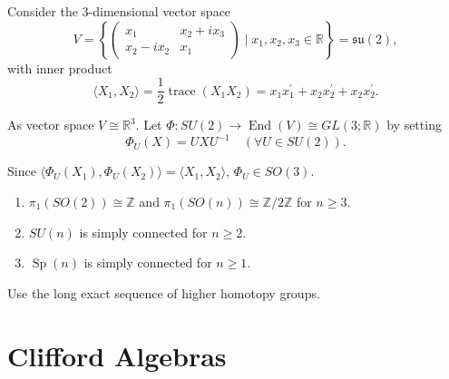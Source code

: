 \documentclass[11pt]{homework}
\begin{document}
\begin{remark}
    Consider the 3-dimensional vector space 
    \begin{equation*}
        V = \left\{\begin{pmatrix}
            x_1 & x_2 + i x_3 \\
            x_2 - i x_2 & x_1
        \end{pmatrix} \mid x_1, x_2, x_3 \in \mathbb{R} \right\} = \mathfrak{su(2)},
    \end{equation*}
    with inner product 
    \begin{equation*}
        \langle X_1, X_2 \rangle = \frac{1}{2} \operatorname{trace} (X_1 X_2) = x_1 x_1^\prime + x_2 x_2^\prime + x_2 x_2^\prime.
    \end{equation*}

    As vector space $V \cong \mathbb{R}^3$.
    Let $\Phi : SU(2) \rightarrow \operatorname{End}(V) \cong GL(3 ; \mathbb{R})$ by setting 
    \begin{equation*}
        \Phi_U (X) = U X U^{-1} \quad (\forall U \in SU(2)).
    \end{equation*}

    Since $\langle \Phi_U (X_1), \Phi_U (X_2) \rangle = \langle X_1, X_2 \rangle$, $\Phi_U \in SO(3)$.
\end{remark}


\begin{theorem}
    \begin{enumerate}
        \item $\pi_{1}(S O(2)) \cong \mathbb{Z}$ and $\pi_{1}(S O(n)) \cong \mathbb{Z} / 2 \mathbb{Z}$ for $n \geq 3$.
        \item $S U(n)$ is simply connected for $n \geq 2$.
        \item $\operatorname{Sp}(n)$ is simply connected for $n \geq 1$.
    \end{enumerate}
\end{theorem}

\begin{remark}
    Use the long exact sequence of higher homotopy groups.
\end{remark}

\section*{Clifford Algebras}
\end{document}
